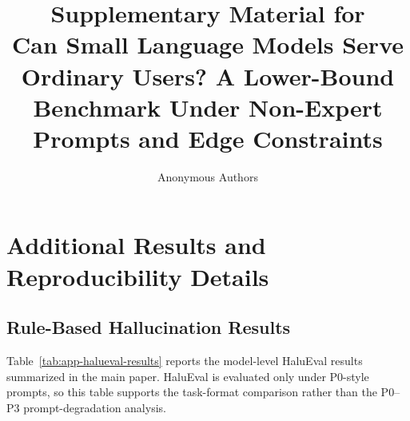 \documentclass[letterpaper]{article}
\title{Supplementary Material for\\
Can Small Language Models Serve Ordinary Users? A Lower-Bound Benchmark Under Non-Expert Prompts and Edge Constraints}
\author{Anonymous Authors}
\begin{document}
\maketitle



\section{Additional Results and Reproducibility Details}


\subsection{Rule-Based Hallucination Results}
\label{app:halueval-results}

Table~\ref{tab:app-halueval-results} reports the model-level HaluEval results
summarized in the main paper. HaluEval is evaluated
only under P0-style prompts, so this table supports the task-format comparison
rather than the P0--P3 prompt-degradation analysis.
\end{document}
